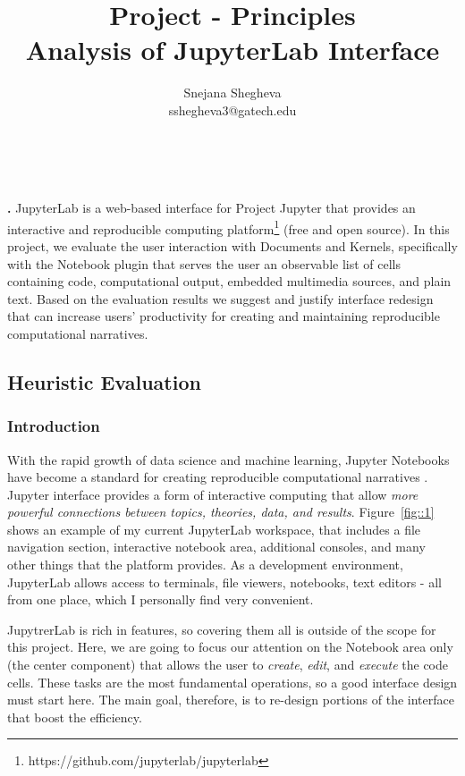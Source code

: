 \documentclass[12pt,letterpaper]{article}
\makeatletter
\renewcommand{\maketitle}{\bgroup
   \begin{center}
   \textbf{{\fontsize{18pt}{20}\selectfont \@title}}\\
   \vspace{10pt}
   {\fontsize{12pt}{0}\selectfont \@author} 
   \end{center}
}
\newenvironment{myquote}[1]%
  {\list{}{\leftmargin=#1\rightmargin=#1}\item[]}%
  {\endlist}
\renewenvironment{abstract}
{\vspace*{-.5in}\fontsize{12pt}{12}\begin{myquote}{.5in}
\noindent \par{\bfseries \abstractname.}}
{\medskip\noindent
\end{myquote}
}
\makeatother
\begin{document}
\title{Project - Principles\\Analysis of JupyterLab Interface}
\author{Snejana Shegheva \\ sshegheva3@gatech.edu}

\maketitle
\thispagestyle{fancy}

\begin{abstract}
JupyterLab is a web-based interface for Project Jupyter that provides an interactive and reproducible computing platform\footnote{https://github.com/jupyterlab/jupyterlab} (free and open source). In this project, we evaluate the user interaction with Documents and Kernels, specifically with the Notebook plugin that serves the user an observable list of cells containing code, computational output, embedded multimedia sources, and plain text. Based on the evaluation results we suggest and justify interface redesign that can increase users' productivity for creating and maintaining reproducible computational narratives.
\end{abstract}

\subsection*{Heuristic Evaluation}

\subsubsection*{Introduction}
With the rapid growth of data science and machine learning, Jupyter Notebooks have become a standard for creating reproducible computational narratives \cite{perkel2018jupyter}. 
Jupyter interface provides a form of interactive computing that allow \textit{more powerful connections between topics, theories, data, and results}. Figure~\ref{fig::1} shows an example of my current JupyterLab workspace, that includes a file navigation section, interactive notebook area, additional consoles, and many other things that the platform provides. As a development environment, JupyterLab allows access to terminals, file viewers, notebooks, text editors - all from one place, which I personally find very convenient. 

JupytrerLab is rich in features, so covering them all is outside of the scope for this project. Here, we are going to focus our attention on the Notebook area only (the center component) that allows the user to \textit{create}, \textit{edit}, and \textit{execute} the code cells. These tasks are the most fundamental operations, so a good interface design must start here. The main goal, therefore, is to re-design portions of the interface that boost the efficiency.
\end{document}
